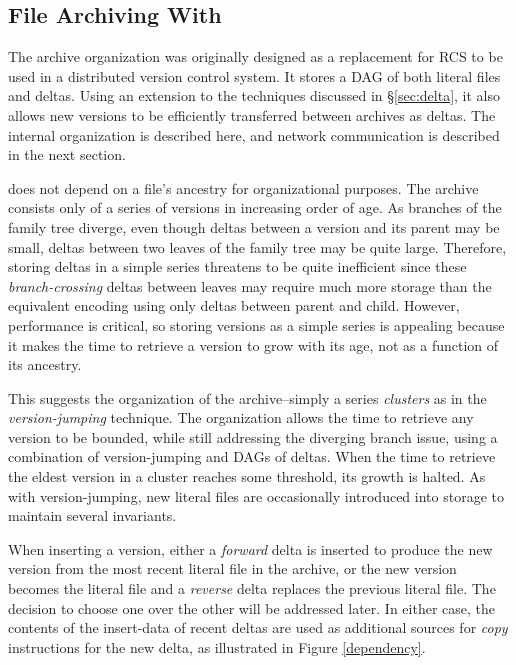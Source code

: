 \documentclass{llncs}
\begin{document}

\subsection{File Archiving With \xd}

The \xd {} archive organization was originally designed as a
replacement for RCS to be used in a distributed version control
system.  It stores a DAG of both literal files and deltas.  Using an
extension to the techniques discussed in \S\ref{sec:delta}, it
also allows new versions to be efficiently transferred between
archives as deltas.  The internal organization is described here, and
network communication is described in the next section.

\xd {} does not depend on a file's ancestry for organizational
purposes.  The archive consists only of a series of versions in
increasing order of age.  As branches of the family tree diverge, even
though deltas between a version and its parent may be small, deltas
between two leaves of the family tree may be quite large.  Therefore,
storing deltas in a simple series threatens to be quite inefficient
since these \emph{branch-crossing} deltas between leaves may require
much more storage than the equivalent encoding using only deltas
between parent and child.  However, performance is critical, so
storing versions as a simple series is appealing because it makes the
time to retrieve a version to grow with its age, not as a function of
its ancestry.

This suggests the organization of the \xd {} archive--simply a series
\emph{clusters} as in the \emph{version-jumping} technique.  The
organization allows the time to retrieve any version to be bounded,
while still addressing the diverging branch issue, using a combination
of version-jumping and DAGs of deltas.  When the time to retrieve the
eldest version in a cluster reaches some threshold, its growth is
halted.  As with version-jumping, new literal files are occasionally
introduced into storage to maintain several invariants.


When inserting a version, either a \emph{forward} delta is inserted to
produce the new version from the most recent literal file in the
archive, or the new version becomes the literal file and a
\emph{reverse} delta replaces the previous literal file.  The decision
to choose one over the other will be addressed later.  In either case,
the contents of the insert-data of recent deltas are used as
additional sources for \emph{copy} instructions for the new delta, as
illustrated in Figure \ref{dependency}.
\end{document}

